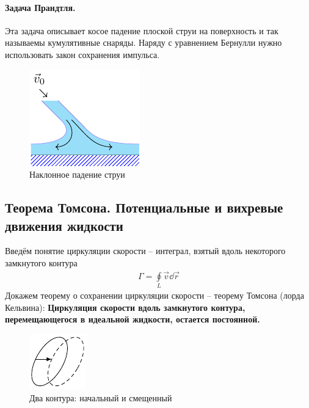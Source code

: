 \paragraph{Задача Прандтля.} Эта задача описывает косое падение плоской струи на поверхность и так называемы кумулятивные снаряды. Наряду с уравнением Бернулли нужно использовать закон сохранения импульса.
\begin{figure}[H]
	\centering
	\includegraphics[scale=1.5]{img/prandtl}
	\caption{Наклонное падение струи}
	\label{fig:figure11}
\end{figure}



\subsection{Теорема Томсона. Потенциальные и вихревые движения жидкости}

Введём понятие циркуляции скорости -- интеграл, взятый вдоль некоторого замкнутого контура
\begin{align*}
\Gamma = \oint \limits_ { L } \vec{v} \dd{\vec{r}}
\end{align*}
Докажем теорему о сохранении циркуляции скорости -- теорему Томсона (лорда Кельвина):
\textbf{Циркуляция скорости вдоль замкнутого контура, перемещающегося в идеальной жидкости, остается постоянной.}

\begin{figure}[h!]
	\centering
	\includegraphics[scale=1.5]{img/2contur}
	\caption{Два контура: начальный и смещенный}
	\label{fig:figure13}
\end{figure}

